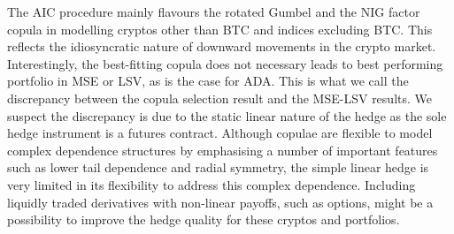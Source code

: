 The AIC procedure mainly flavours the rotated Gumbel and the NIG
factor copula in modelling cryptos other than BTC and 
indices excluding BTC. This reflects the idiosyncratic nature of
downward movements in the crypto market. Interestingly, the best-fitting
copula does not necessary leads to best performing portfolio in MSE or
LSV, as is the case for ADA.
This is what we call the discrepancy between the copula selection
result and the MSE-LSV results. 
We suspect the discrepancy is due to the static linear nature of the
hedge as the sole hedge instrument is a futures contract. 
Although copulae are flexible to model complex dependence structures
by emphasising a number of important features such as lower tail
dependence and radial symmetry, the simple linear hedge is very
limited in its flexibility to address this complex dependence.
Including liquidly traded derivatives with non-linear payoffs, such as
options, might be a possibility to improve the hedge quality for these
cryptos and portfolios. 





